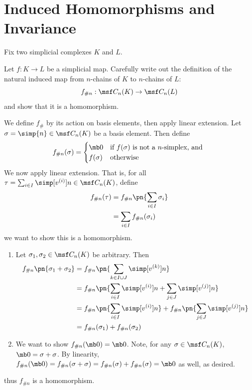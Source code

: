 \section{Induced Homomorphisms and Invariance}
Fix two simplicial complexes $K$ and $L$.
\begin{problem}[16.14]
  Let $f : K \to L$ be a simplicial map. Carefully write out the definition of
  the natural induced map from $n$-chains of $K$ to $n$-chains of $L$:
  \[
    f_{\# n} : \msf C_n(K) \to \msf C_n(L)
  \]
  and show that it is a homomorphism.
\end{problem}
\begin{solution}
  We define $f_\#$ by its action on basis elements, then apply linear extension.
  Let $\sigma = \simp{n} \in \msf C_n(K)$ be a basis element. Then define
  \[
    f_{\# n}(\sigma) =
    \begin{cases}
      \mb 0 & \text{if $f(\sigma)$ is not a $n$-simplex, and }\\
      f(\sigma) & \text{otherwise}
    \end{cases}
  \]
  We now apply linear extension. That is, for all $\tau = \sum_{i \in I}
  \simp[v^{(i)}]{n} \in \msf C_n(K)$, define
  \begin{align*}
    f_{\# n}(\tau)
    &= f_{\# n} \pn{\sum_{i\in I} \sigma_i} \\
    &= \sum_{i\in I} f_{\# n}(\sigma_i)
  \end{align*}
  we want to show this is a homomorphism.
  \begin{enumerate}[label=(\arabic*)]
    \item Let $\sigma_1, \sigma_2 \in \msf C_n(K)$ be arbitrary. Then
      \begin{align*}
        f_{\# n}\pn{\sigma_1 + \sigma_2}
        &= f_{\# n} \pn{\sum_{k\in I \cup J} \simp[v^{(k)}]{n}} \\
        &= f_{\# n} \pn{\sum_{i\in I} \simp[v^{(i)}]{n} + \sum_{j \in J} \simp[v^{(j)}]{n}} \\
        &= f_{\# n} \pn{\sum_{i\in I} \simp[v^{(i)}]{n}} + f_{\# n}\pn{\sum_{j \in J} \simp[v^{(j)}]{n}} \\
        &= f_{\# n}(\sigma_1) + f_{\# n}(\sigma_2)
      \end{align*}
    \item We want to show $f_{\# n}(\mb 0) = \mb 0$. Note, for any $\sigma \in
      \msf C_n(K)$, $\mb 0 = \sigma + \sigma$. By linearity, $f_{\# n}(\mb 0) =
      f_{\# n}(\sigma + \sigma) = f_{\# n}(\sigma) + f_{\# n}(\sigma) = \mb 0$
      as well, as desired.
  \end{enumerate}
  thus $f_{\# n}$ is a homomorphism.
\end{solution}
